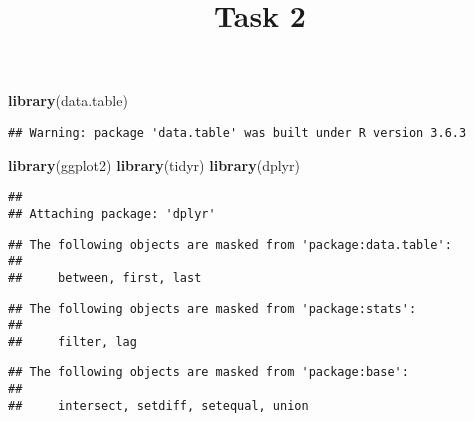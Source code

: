 \documentclass[
]{article}
\title{Task 2}
\author{}
\date{\vspace{-2.5em}}
\newenvironment{Shaded}{\begin{snugshade}}{\end{snugshade}}
\newcommand{\KeywordTok}[1]{\textcolor[rgb]{0.13,0.29,0.53}{\textbf{#1}}}
\newcommand{\NormalTok}[1]{#1}
\begin{document}
\maketitle

\begin{Shaded}
\begin{Highlighting}[]
\KeywordTok{library}\NormalTok{(data.table)}
\end{Highlighting}
\end{Shaded}

\begin{verbatim}
## Warning: package 'data.table' was built under R version 3.6.3
\end{verbatim}

\begin{Shaded}
\begin{Highlighting}[]
\KeywordTok{library}\NormalTok{(ggplot2)}
\KeywordTok{library}\NormalTok{(tidyr)}
\KeywordTok{library}\NormalTok{(dplyr)}
\end{Highlighting}
\end{Shaded}

\begin{verbatim}
## 
## Attaching package: 'dplyr'
\end{verbatim}

\begin{verbatim}
## The following objects are masked from 'package:data.table':
## 
##     between, first, last
\end{verbatim}

\begin{verbatim}
## The following objects are masked from 'package:stats':
## 
##     filter, lag
\end{verbatim}

\begin{verbatim}
## The following objects are masked from 'package:base':
## 
##     intersect, setdiff, setequal, union
\end{verbatim}
\end{document}

